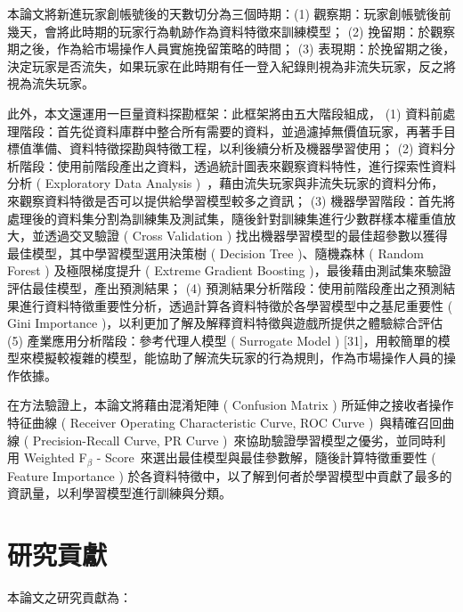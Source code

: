 本論文將新進玩家創帳號後的天數切分為三個時期：(1) 觀察期：玩家創帳號後前幾天，會將此時期的玩家行為軌跡作為資料特徵來訓練模型； (2) 挽留期：於觀察期之後，作為給市場操作人員實施挽留策略的時間； (3) 表現期：於挽留期之後，決定玩家是否流失，如果玩家在此時期有任一登入紀錄則視為非流失玩家，反之將視為流失玩家。

此外，本文還運用一巨量資料探勘框架：此框架將由五大階段組成， (1) 資料前處理階段：首先從資料庫群中整合所有需要的資料，並過濾掉無價值玩家，再著手目標值準備、資料特徵探勘與特徵工程，以利後續分析及機器學習使用； (2) 資料分析階段：使用前階段產出之資料，透過統計圖表來觀察資料特性，進行探索性資料分析 ( Exploratory Data Analysis )~\cite{tukey1977exploratory}，藉由流失玩家與非流失玩家的資料分佈，來觀察資料特徵是否可以提供給學習模型較多之資訊； (3) 機器學習階段：首先將處理後的資料集分割為訓練集及測試集，隨後針對訓練集進行少數群樣本權重值放大，並透過交叉驗證 ( Cross Validation ) 找出機器學習模型的最佳超參數以獲得最佳模型，其中學習模型選用決策樹 ( Decision Tree )、隨機森林 ( Random Forest ) 及極限梯度提升 ( Extreme Gradient Boosting )，最後藉由測試集來驗證評估最佳模型，產出預測結果； (4) 預測結果分析階段：使用前階段產出之預測結果進行資料特徵重要性分析，透過計算各資料特徵於各學習模型中之基尼重要性 ( Gini Importance )，以利更加了解及解釋資料特徵與遊戲所提供之體驗綜合評估 (5) 產業應用分析階段：參考代理人模型 ( Surrogate Model ) [31]，用較簡單的模型來模擬較複雜的模型，能協助了解流失玩家的行為規則，作為市場操作人員的操作依據。

在方法驗證上，本論文將藉由混淆矩陣 ( Confusion Matrix ) 所延伸之接收者操作特征曲線 ( Receiver Operating Characteristic Curve, ROC Curve )~\cite{fawcett2006introduction}與精確召回曲線 ( Precision-Recall Curve, PR Curve )~\cite{article}來協助驗證學習模型之優劣，並同時利用 Weighted F$_{\beta}$ - Score~\cite{Goutte2005API}來選出最佳模型與最佳參數解，隨後計算特徵重要性 ( Feature Importance ) 於各資料特徵中，以了解到何者於學習模型中貢獻了最多的資訊量，以利學習模型進行訓練與分類。

\section{研究貢獻}

本論文之研究貢獻為：

